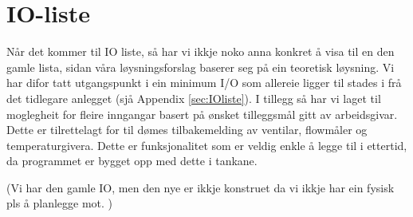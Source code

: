 \section{IO-liste}
\thispagestyle{fancy}

Når det kommer til \gls{IO} liste, så har vi ikkje noko anna konkret å visa til en den gamle lista, sidan våra løysningsforslag baserer seg på ein teoretisk løysning. 
Vi har difor tatt utgangspunkt i ein minimum I/O som allereie ligger til stades i frå det tidlegare anlegget (sjå Appendix \ref{sec:IOliste}). 
I tillegg så har vi laget til moglegheit for fleire inngangar basert på ønsket tilleggsmål gitt av arbeidsgivar. 
Dette er tilrettelagt for til dømes tilbakemelding av ventilar, flowmåler og temperaturgivera.
Dette er funksjonalitet som er veldig enkle å legge til i ettertid, da programmet er bygget opp med dette i tankane.

\newpage

(Vi har den gamle IO, men den nye er ikkje konstruet da vi ikkje har ein fysisk pls å planlegge mot. )